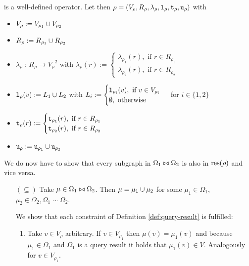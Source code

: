 \begin{definition}
\begin{proofof}{ is a well-defined operator.}
Let then $\rho = (V_\rho, R_\rho, \lambda_\rho, \texttt{l}_\rho, \texttt{t}_\rho, \texttt{u}_\rho)$
with
\begin{itemize}[label={}]
  \item $V_\rho := V_{\rho_1} \cup V_{\rho_2}$
  \item $R_\rho := R_{\rho_1} \cup R_{\rho_2}$
  \item $\lambda_\rho ~:~ R_\rho \rightarrow {V_\rho}^2$ with
    $\lambda_\rho(r) := \begin{cases}
                          \lambda_{\rho_1}(r), \text{ if } r \in R_{\rho_1} \\
                          \lambda_{\rho_2}(r), \text{ if } r \in R_{\rho_2}
                        \end{cases}$
  \item $\texttt{l}_\rho(v) := L_1 \cup L_2$ with
    $L_i := \begin{cases}
              \texttt{l}_{\rho_i}(v), \text{ if } v \in V_{\rho_i} \\
              \emptyset, \text{ otherwise }
            \end{cases}$ for $i \in \{1,2\}$
  \item $\texttt{t}_\rho(r) := \begin{cases}
                             \texttt{t}_{\rho_1}(r), \text{ if } r \in R_{\rho_1} \\
                             \texttt{t}_{\rho_2}(r), \text{ if } r \in R_{\rho_2}
                           \end{cases}$
  \item $\texttt{u}_\rho := \texttt{u}_{\rho_1} \cup \texttt{u}_{\rho_2}$
\end{itemize}

We do now have to show that every subgraph in $\Omega_1 \bowtie \Omega_2$ is also
in $\text{res}(\rho)$ and vice versa.

\begin{itemize}
  \item[$(\subseteq)$]
    Take $\mu \in \Omega_1 \bowtie \Omega_2$. Then $\mu = \mu_1 \cup \mu_2$ for
    some $\mu_1 \in \Omega_1$, $\mu_2 \in \Omega_2, \Omega_1 \sim \Omega_2$.
    
    We show that each constraint of Definition \ref{def:query-result} is fulfilled:
    \begin{enumerate}[(1)]
      \item %
        Take $v \in V_\rho$ arbitrary. If $v \in V_{\rho_1}$ then $\mu(v) = \mu_1(v)$ and
        because $\mu_1 \in \Omega_1$ and $\Omega_1$ is a query result it holds that $\mu_1(v) \in V$.
        Analogously for $v \in V_{\rho_1}$.
        

\end{enumerate}
\end{itemize}
\end{proofof}
\end{definition}
